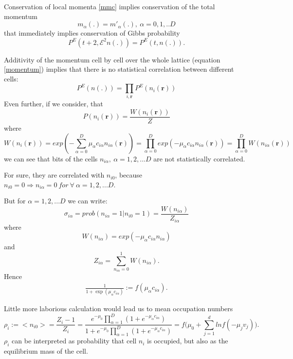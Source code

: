 Conservation of local momenta \ref{mmc} implies conservation of the total momentum
\begin{equation}
m_{\alpha}(.) = m'_{\alpha}(.),~\alpha=0,1,..D
\end{equation}
that immediately implies conservation of Gibbs probability
\begin{equation}
P^E(t+2,\mathcal{E}^2n(.)) = P^E(t,n(.)).
\end{equation}

Additivity of the momentum cell by cell over the whole lattice (equation \ref{momentum}) implies that there is no statistical correlation between different cells:
\begin{equation}
P^E(n(.)) = \prod_{i,\bm{r}} P^E(n_i(\bm{r}))
\end{equation} 
Even further, if we consider, that
\begin{equation}
P(n_i(\bm{r})) = \frac{W(n_i(\bm{r}))}{Z}
\end{equation}
where
\begin{equation}
W(n_i(\bm{r}))=exp(-\sum_{\alpha = 0}^D\mu_{\alpha}c_{i\alpha}n_{i\alpha}(\bm{r})) = \prod_{\alpha=0}^Dexp(-\mu_{\alpha}c_{i\alpha}n_{i\alpha}(\bm{r})) = \prod_{\alpha = 0}^D W(n_{i\alpha}(\bm{r}))
\end{equation}
we can see that bits of the cells $n_{i\alpha},~\alpha = 1,2,...D$ are not statistically correlated.

For sure, they are correlated with $n_{i0}$, because $n_{i0} = 0 \Rightarrow n_{i\alpha} = 0~ for~ \forall ~ \alpha = 1,2,...D$.

But for $\alpha=1,2,...D$ we can write:
\begin{equation} \label{form2}
\sigma_{i\alpha} = prob(n_{i\alpha} = 1 | n_{i0} = 1) = \frac{W(n_{i\alpha})}{Z_{i\alpha}}
\end{equation}
where
\begin{equation}
W(n_{i\alpha}) = exp(-\mu_{\alpha}c_{i\alpha}n_{i\alpha})
\end{equation}
and
\begin{equation}
Z_{i\alpha} = \sum_{n_{i\alpha}=0}^1 W(n_{i\alpha}). 
\end{equation}
Hence
\begin{align}
\frac{1}{1 + \exp(\mu_{\alpha} c_{i\alpha})} := f(\mu_{\alpha} c_{i\alpha}).
\end{align}

Little more laborious calculation would lead us to mean occupation numbers
\begin{equation} \label{form1}
\rho_i := <n_{i0}> = \frac{Z_i - 1}{Z_i} = \frac{e^{-\mu_0}\prod_{\alpha = 1}^D(1+e^{-{\mu_{\alpha} c_{i\alpha}}})}{1+e^{-\mu_0}\prod_{\alpha = 1}^D(1+e^{-{\mu_{\alpha} c_{i\alpha}}}) } = f\big(\mu_0 + \sum_{j=1}^d ln f(-\mu_j v_j) \big).
\end{equation}
$\rho_i$ can be interpreted as probability that cell $n_i$ is occupied, but also as the equilibrium mass of the cell.

